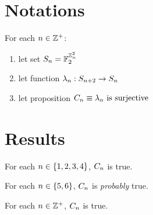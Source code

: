 \documentclass{paper}
\begin{document}

\begin{center}
\Large{\mytitle}
\end{center}

\tableofcontents

\begin{flushleft}


\section{Notations}

For each $n \in \mathbb{Z}^+$:
\begin{enumerate}
\item let set $S_{n} = \mathbb{F}_2 ^ {\mathbb{Z}_n ^ 2}$
\item let function $\lambda_{n}: S_{n+2} \to S_{n}$
\item let proposition $C_{n} \equiv \lambda_{n}
  \text{ is surjective}$
\end{enumerate}


\section{Results}

\begin{remark}
For each $n \in \{1, 2, 3, 4\}$, $C_{n}$ is true.
\end{remark}

\begin{remark}
For each $n \in \{5, 6\}$, $C_{n}$ is \emph{probably} true.
\end{remark}

\begin{conjecture}
For each $n \in \mathbb{Z}^+$, $C_{n}$ is true.
\end{conjecture}


\end{flushleft}
\end{document}
